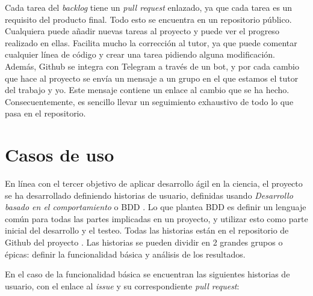 Cada tarea del \emph{backlog} tiene un \emph{pull request} enlazado, ya que cada tarea es un requisito del producto final. Todo
esto se encuentra en un repositorio público. Cualquiera puede añadir nuevas tareas al proyecto y puede ver el progreso realizado en ellas.
Facilita mucho la corrección al tutor, ya que puede comentar cualquier línea de código y crear una tarea pidiendo alguna
modificación. Además, Github se integra con Telegram a través de un bot, y por cada cambio que hace al proyecto se envía un mensaje
a un grupo en el que estamos el tutor del trabajo y yo. Este mensaje contiene un enlace al cambio que se ha hecho. Consecuentemente,
es sencillo llevar un seguimiento exhaustivo de todo lo que pasa en el repositorio.

\section{Casos de uso}

En línea con el tercer objetivo de aplicar desarrollo ágil en la ciencia, el proyecto se ha desarrollado definiendo
historias de usuario, definidas usando \emph{Desarrollo basado en el comportamiento} o BDD \cite{BDD}. Lo que 
plantea BDD es definir un lenguaje común para todas las partes implicadas en un proyecto, y utilizar esto como parte inicial 
del desarrollo y el testeo. Todas las historias están en el repositorio de Github del proyecto \cite{project_repository}.
Las historias se pueden dividir en 2 grandes grupos o épicas: definir la funcionalidad básica y análisis de los resultados.

En el caso de la funcionalidad básica se encuentran las siguientes historias de usuario, con el enlace al
\emph{issue} y su correspondiente \emph{pull request}:


